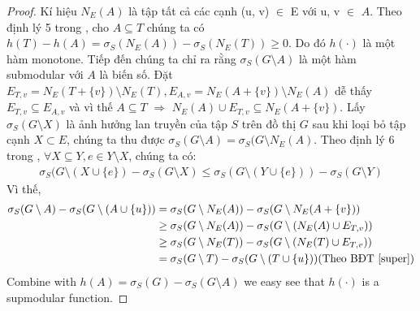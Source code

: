 \begin{proof}	
	Kí hiệu $N_E(A)$ là tập tất cả các cạnh (u, v) $\in$ E với u, v $\in$ $A$. Theo định lý 5 trong \cite{khali}, cho $A \subseteq T$ chúng ta có $h(T)-h(A)=\sigma_{S}(N_E(A))- \sigma_{S}(N_E(T)) \geq 0$. Do đó $h(\cdot)$ là một hàm monotone. 
	Tiếp đến chúng ta chỉ ra rằng $\sigma_S(G \setminus A)$ là một hàm submodular với $A$ là biến số. Đặt $E_{T, v}=N_E(T+\{v\})\setminus N_E(T), E_{A, v}= N_E(A+\{v\}) \setminus N_E(A)$ dễ thấy $E_{T, v} \subseteq E_{A, v}$  và vì thế $A \subseteq T$ $\Rightarrow$ $N_E(A)\cup E_{T, v} \subseteq N_E(A+ \{v\})$. Lấy $\sigma_S(G \setminus X)$ là ảnh hưởng lan truyền của tập $S$ trên đồ thị $G$ sau khi loại bỏ tập cạnh $X \subset E$, chúng ta thu được $\sigma_{S}(G \setminus A)=\sigma_{S}(G \setminus N_E(A)$. Theo định lý 6 trong \cite{khali}, $\forall X \subseteq Y, e \in Y\setminus X$, chúng ta có: 
	\begin{align}
	\sigma_{S}(G \setminus (X \cup \{e\}) - \sigma_{S}(G \setminus X) 
	\leq \sigma_{S}(G \setminus (Y \cup \{e\})) - \sigma_{S}(G \setminus Y)
	\label{super}
	\end{align}
	Vì thế,
	\begin{align}
	\sigma_{S}(G \setminus A)-\sigma_{S}(G \setminus (A \cup \{u\})) 
	& =\sigma_{S}(G \setminus N_E(A))-\sigma_{S}(G \setminus N_E(A+\{v\})) 
	\\
	&	\geq \sigma_{S}(G \setminus N_E(A))-\sigma_{S}(G \setminus (N_E(A) \cup E_{T, v})) 
	\\
	&	\geq \sigma_{S}(G \setminus N_E(T))-\sigma_{S}(G \setminus (N_E(T) \cup E_{T, v}))  
	\\
	& = \sigma_{S}(G\setminus T)-\sigma_{S}(G \setminus (T \cup \{u\}))  (\mbox{Theo BĐT \eqref{super}})
	\end{align}
	Combine with $h(A)= \sigma_S(G)- \sigma_S(G\setminus A)$ we easy see that $h(\cdot)$ is a supmodular function.
\end{proof}


